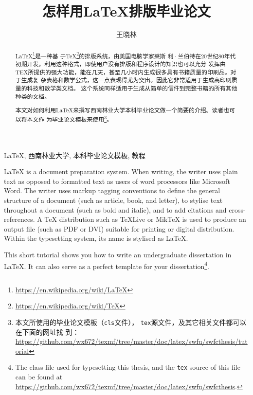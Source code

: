 \documentclass{swfuthesis}
\title{怎样用\LaTeX{}排版毕业论文}                      %
\author{王晓林}          %
\begin{document}
\maketitle %

\begin{abstract} %
  \LaTeX{}\footnote{\url{https://en.wikipedia.org/wiki/LaTeX}}是一种基
  于\TeX{}\footnote{\url{https://en.wikipedia.org/wiki/TeX}}的排版系统，由美国电脑学家莱斯
  利·兰伯特在20世纪80年代初期开发，利用这种格式，即使用户没有排版和程序设计的知识也可以充分
  发挥由TEX所提供的强大功能，能在几天，甚至几小时内生成很多具有书籍质量的印刷品。对于生成复
  杂表格和数学公式，这一点表现得尤为突出。因此它非常适用于生成高印刷质量的科技和数学类文档。
  这个系统同样适用于生成从简单的信件到完整书籍的所有其他种类的文档。\cite{wiki:latexcn}

  本文对如何利用\LaTeX{}来撰写西南林业大学本科毕业论文做一个简要的介绍。读者也可以将本文作
  为毕业论文模板来使用\footnote{本文所使用的毕业论文模板（\texttt{cls}文件），
    \texttt{tex}源文件，及其它相关文件都可以在下面的网址找
    到：\url{https://github.com/wx672/texmf/tree/master/doc/latex/swfu/swfcthesis/tutorial}}。
\end{abstract}

\begin{keyword} %
  \LaTeX{}, 西南林业大学, 本科毕业论文模板, 教程
\end{keyword}

\begin{EAbstract} %
  \LaTeX{} is a document preparation system. When writing, the writer uses plain text as
  opposed to formatted text as users of word processors like Microsoft Word. The writer
  uses markup tagging conventions to define the general structure of a document (such as
  article, book, and letter), to stylise text throughout a document (such as bold and
  italic), and to add citations and cross-references. A \TeX{} distribution such as
  \TeX{}Live or Mik\TeX{} is used to produce an output file (such as PDF or DVI) suitable
  for printing or digital distribution. Within the typesetting system, its name is
  stylised as \LaTeX{}.\cite{wiki:latex}

  This short tutorial shows you how to write an undergraduate dissertation in \LaTeX{}. It
  can also serve as a perfect template for your dissertation\footnote{The class file used
    for typesetting this thesis, and the \texttt{tex} source of this file can be found at
    \url{https://github.com/wx672/texmf/tree/master/doc/latex/swfu/swfcthesis}.}.
\end{EAbstract}
\end{document}
